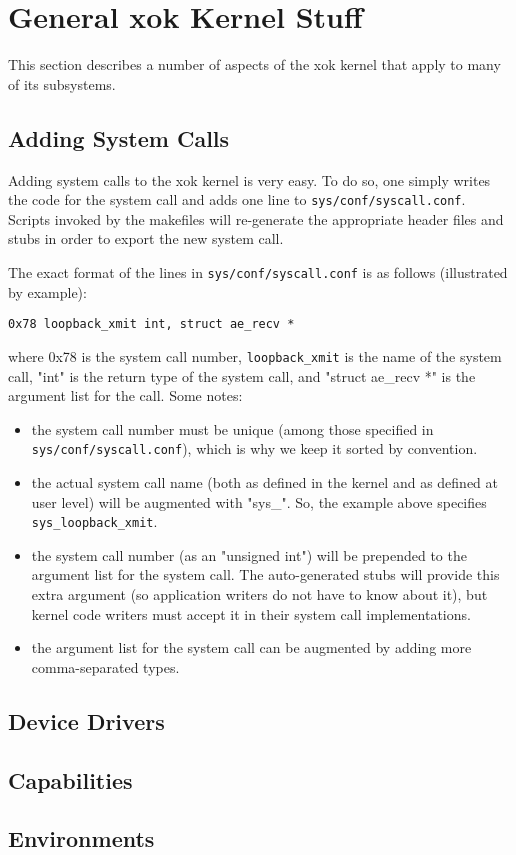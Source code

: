 
\section {General xok Kernel Stuff}

This section describes a number of aspects of the xok kernel that apply
to many of its subsystems.

\subsection {Adding System Calls}

Adding system calls to the xok kernel is very easy.  To do so, one simply
writes the code for the system call and adds one line to
{\tt sys/conf/syscall.conf}.  Scripts invoked by the makefiles will
re-generate the appropriate header files and stubs in order to export
the new system call.

The exact format of the lines in {\tt sys/conf/syscall.conf} is as follows
(illustrated by example):

\centerline{\tt 0x78    loopback\_xmit   int, struct ae\_recv *}

where 0x78 is the system call number, {\tt loopback\_xmit} is the name of
the system call, "int" is the return type of the system call, and
"struct ae\_recv *" is the argument list for the call.  Some notes:
\begin{itemize}
\item the system call number must be unique (among those specified in
      {\tt sys/conf/syscall.conf}), which is why we keep it sorted by
      convention.
\item the actual system call name (both as defined in the kernel and as
      defined at user level) will be augmented with "sys\_".  So, the
      example above specifies {\tt sys\_loopback\_xmit}.
\item the system call number (as an "unsigned int") will be prepended to
      the argument list for the system call.  The auto-generated stubs will
      provide this extra argument (so application writers do not have to know
      about it), but kernel code writers must accept it in their system
      call implementations.
\item the argument list for the system call can be augmented by adding
      more comma-separated types.
\end{itemize}

\subsection {Device Drivers}

\subsection {Capabilities}

\subsection {Environments}



